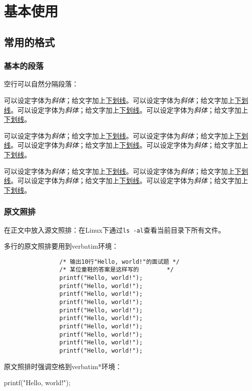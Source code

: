 \chapter{基本使用}

	\section{常用的格式}

		\subsection{基本的段落}
			空行可以自然分隔段落：

			可以设定字体为\textit{斜体}；给文字加上\underline{下划线}。可以设定字体为\textit{斜体}；给文字加上\underline{下划线}。可以设定字体为\textit{斜体}；给文字加上\underline{下划线}。可以设定字体为\textit{斜体}；给文字加上\underline{下划线}。

			可以设定字体为\textit{斜体}；给文字加上\underline{下划线}。可以设定字体为\textit{斜体}；给文字加上\underline{下划线}。可以设定字体为\textit{斜体}；给文字加上\underline{下划线}。可以设定字体为\textit{斜体}；给文字加上\underline{下划线}。

			可以设定字体为\textit{斜体}；给文字加上\underline{下划线}。可以设定字体为\textit{斜体}；给文字加上\underline{下划线}。可以设定字体为\textit{斜体}；给文字加上\underline{下划线}。可以设定字体为\textit{斜体}；给文字加上\underline{下划线}。

		\subsection{原文照排}
			在正文中放入源文照排：在Linux下通过\verb|ls -al|查看当前目录下所有文件。

			多行的原文照排要用到verbatim环境：
			\begin{verbatim}
				/* 输出10行"Hello, world!"的面试题 */
				/* 某位童鞋的答案是这样写的        */
				printf("Hello, world!");
				printf("Hello, world!");
				printf("Hello, world!");
				printf("Hello, world!");
				printf("Hello, world!");
				printf("Hello, world!");
				printf("Hello, world!");
				printf("Hello, world!");
				printf("Hello, world!");
				printf("Hello, world!");
			\end{verbatim}

			原文照排时强调空格到verbatim*环境：
			\begin{verbatim*}
				printf("Hello, world!");
			\end{verbatim*}


